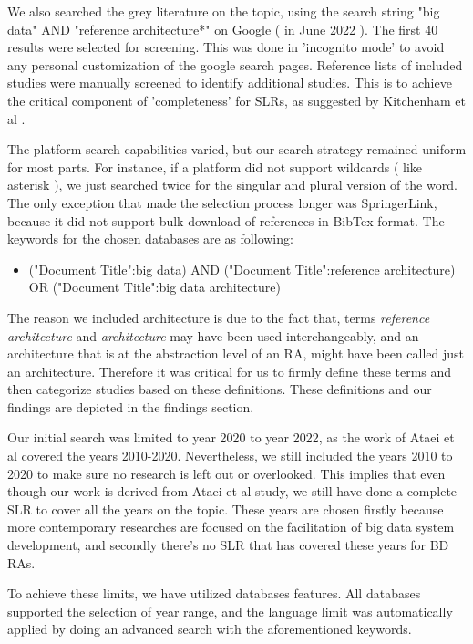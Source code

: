 \documentclass{ieeeaccess}
\begin{document}
We also searched the grey literature on the topic, using the search string "big data" AND "reference architecture*" on Google ( in June 2022 ). The first 40 results were selected for screening. This was done in 'incognito mode' to avoid any personal customization of the google search pages. Reference lists of included studies were manually screened to identify additional studies. This is to achieve the critical component of 'completeness' for SLRs, as suggested by Kitchenham et al \cite{kitchenham2015evidence}.

The platform search capabilities varied, but our search strategy remained uniform for most parts. For instance, if a platform did not support wildcards ( like asterisk ), we just searched twice for the singular and plural version of the word. The only exception that made the selection process longer was SpringerLink, because it did not support bulk download of references in BibTex format. The keywords for the chosen databases are as following: 

\begin{itemize}
    \item ("Document Title":big data) AND ("Document Title":reference architecture) OR ("Document Title":big data architecture)
\end{itemize}

The reason we included architecture is due to the fact that, terms \emph{reference architecture} and \emph{architecture} may have been used interchangeably, and an architecture that is at the abstraction level of an RA, might have been called just an architecture. Therefore it was critical for us to firmly define these terms and then categorize studies based on these definitions. These definitions and our findings are depicted in the findings section.

Our initial search was limited to year 2020 to year 2022, as the work of Ataei et al \cite{AtaeiACIS} covered the years 2010-2020. Nevertheless, we still included the years 2010 to 2020 to make sure no research is left out or overlooked. This implies that even though our work is derived from Ataei et al \cite{AtaeiACIS} study, we still have done a complete SLR to cover all the years on the topic. These years are chosen firstly because more contemporary researches are focused on the facilitation of big data system development, and secondly there's no SLR that has covered these years for BD RAs.

To achieve these limits, we have utilized databases features. All databases supported the selection of year range, and the language limit was automatically applied by doing an advanced search with the aforementioned keywords.
\end{document}
